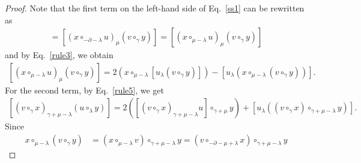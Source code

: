 \documentclass[11pt,letterpaper,reqno]{amsart}
\theoremstyle{definition}
\numberwithin{equation}{section}
\begin{document}
\begin{proof}
Note that the first term on the left-hand side of Eq.~\eqref{ss1} can be rewritten as
   \begin{align*}
      [(u\circ_{\lambda}x)_{\mu}(v\circ_{\gamma}y)]=[(x\circ_{-\partial-\lambda}u)_{\mu}(v\circ_{\gamma}y)]
      =[(x\circ_{\mu-\lambda}u)_{\mu}(v\circ_{\gamma}y)]
   \end{align*}
and by Eq.~\eqref{rule3}, we obtain
   \begin{align}\label{f5}
      [(x\circ_{\mu-\lambda}u)_{\mu}(v\circ_{\gamma}y)]={2}(x\circ_{\mu-\lambda}[u_{\lambda}(v\circ_{\gamma}y)])-[u_{\lambda}(x\circ_{\mu-\lambda}(v\circ_{\gamma}y))].
   \end{align}
For the second term, by Eq.~\eqref{rule5}, we get
   \begin{align}\label{f6}
      [(v\circ_{\gamma}x)_{{\gamma+\mu-\lambda}}(u\circ_{\lambda}y)]={2}([(v\circ_{\gamma}x)_{\gamma+\mu-\lambda}u]\circ_{\gamma+\mu}y)+[u_{\lambda}((v\circ_{\gamma}x)\circ_{\gamma+\mu-\lambda}y)].
   \end{align}
Since
   \begin{align*}
      x\circ_{\mu-\lambda}(v\circ_{\gamma}y)&=(x\circ_{\mu-\lambda}v)\circ_{\gamma+\mu-\lambda}y=(v\circ_{-\partial-\mu+\lambda}x)\circ_{\gamma+\mu-\lambda}y

\end{align*}
\end{proof}
\end{document}
